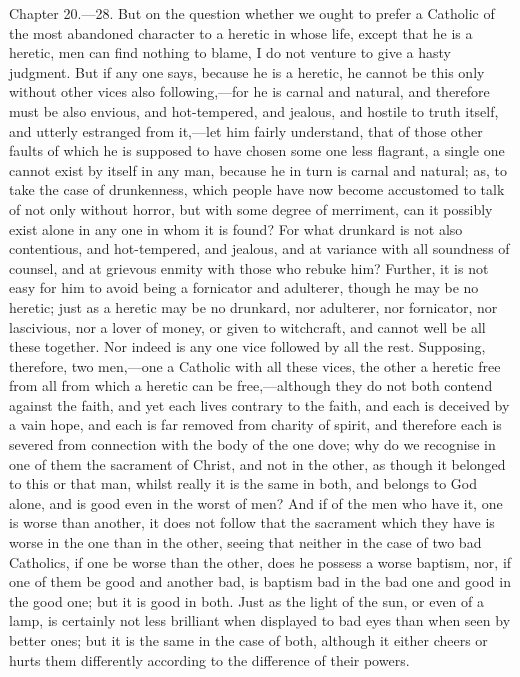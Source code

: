 
Chapter 20.—28. But on the question whether we ought to prefer a Catholic of the most abandoned character to a heretic in whose life, except that he is a heretic, men can find nothing to blame, I do not venture to give a hasty judgment. But if any one says, because he is a heretic, he cannot be this only without other vices also following,—for he is carnal and natural, and therefore must be also envious, and hot-tempered, and jealous, and hostile to truth itself, and utterly estranged from it,—let him fairly understand, that of those other faults of which he is supposed to have chosen some one less flagrant, a single one cannot exist by itself in any man, because he in turn is carnal and natural; as, to take the case of drunkenness, which people have now become accustomed to talk of not only without horror, but with some degree of merriment, can it possibly exist alone in any one in whom it is found? For what drunkard is not also contentious, and hot-tempered, and jealous, and at variance with all soundness of counsel, and at grievous enmity with those who rebuke him? Further, it is not easy for him to avoid being a fornicator and adulterer, though he may be no heretic; just as a heretic may be no drunkard, nor adulterer, nor fornicator, nor lascivious, nor a lover of money, or given to witchcraft, and cannot well be all these together. Nor indeed is any one vice followed by all the rest. Supposing, therefore, two men,—one a Catholic with all these vices, the other a heretic free from all from which a heretic can be free,—although they do not both contend against the faith, and yet each lives contrary to the faith, and each is deceived by a vain hope, and each is far removed from charity of spirit, and therefore each is severed from connection with the body of the one dove; why do we recognise in one of them the sacrament of Christ, and not in the other, as though it belonged to this or that man, whilst really it is the same in both, and belongs to God alone, and is good even in the worst of men? And if of the men who have it, one is worse than another, it does not follow that the sacrament which they have is worse in the one than in the other, seeing that neither in the case of two bad Catholics, if one be worse than the other, does he possess a worse baptism, nor, if one of them be good and another bad, is baptism bad in the bad one and good in the good one; but it is good in both. Just as the light of the sun, or even of a lamp, is certainly not less brilliant when displayed to bad eyes than when seen by better ones; but it is the same in the case of both, although it either cheers or hurts them differently according to the difference of their powers.

